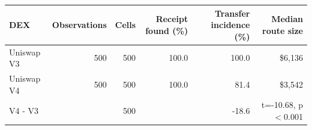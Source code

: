 \begin{tabular}{lrrrrr}
\toprule
DEX & Observations & Cells & Receipt found (\%) & Transfer incidence (\%) & Median route size \\
\midrule
Uniswap V3 & 500 & 500 & 100.0 & 100.0 & \$6,136 \\
Uniswap V4 & 500 & 500 & 100.0 & 81.4 & \$3,542 \\
V4 - V3 &  & 500 &  & -18.6 & t=-10.68, p\ensuremath{<}0.001 \\
\bottomrule
\end{tabular}
